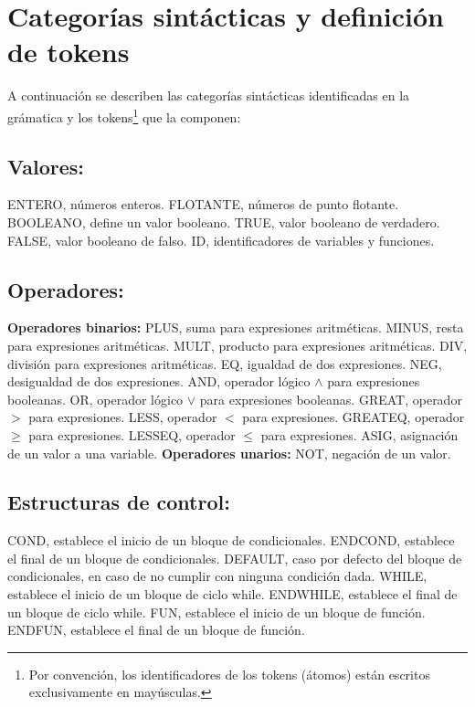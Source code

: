 \documentclass[12pt]{article}
\begin{document}
\section{Categorías sintácticas y definición de tokens}
A continuación se describen las categorías sintácticas identificadas en la grámatica y los tokens\footnote{Por convención, los identificadores de los tokens (átomos) están escritos exclusivamente en mayúsculas.} que la componen:\\
\subsection{Valores:}
\begin{outline}
  \2 ENTERO, números enteros.
    \2 FLOTANTE, números de punto flotante.
    \2 BOOLEANO, define un valor booleano.
    \3 TRUE, valor booleano de verdadero.
    \3 FALSE, valor booleano de falso.
    \3 ID, identificadores de variables y funciones.
\end{outline}
\subsection{Operadores:}
\begin{outline}
	\2 \textbf{Operadores binarios:}
		\3 PLUS, suma para expresiones aritméticas.	
    	\3 MINUS, resta para expresiones aritméticas.
    	\3 MULT, producto para expresiones aritméticas.
    	\3 DIV, división para expresiones aritméticas.
    	\3 EQ, igualdad de dos expresiones.
        \3 NEG, desigualdad de dos expresiones.
    	\3 AND, operador lógico $\land$ para expresiones booleanas.
    	\3 OR, operador lógico $\lor$ para expresiones booleanas.
    	\3 GREAT, operador $>$  para expresiones.
    	\3 LESS, operador $<$ para expresiones.
    	\3 GREATEQ, operador $\geq$ para expresiones.
        \3 LESSEQ, operador $\leq$ para expresiones.
        \3 ASIG, asignación de un valor a una variable.
 	\2 \textbf{Operadores unarios:}
    	\3 NOT, negación de un valor.
\end{outline}
\subsection{Estructuras de control:}
\begin{outline}
 	\2 COND, establece el inicio de un bloque de condicionales.
    \2 ENDCOND, establece el final de un bloque de condicionales.
    \2 DEFAULT, caso por defecto del bloque de condicionales, en caso de no cumplir con ninguna condición dada.
    \2 WHILE, establece el inicio de un bloque de ciclo while.
    \2 ENDWHILE, establece el final de un bloque de ciclo while.
    \2 FUN, establece el inicio de un bloque de función.
    \2 ENDFUN, establece el final de un bloque de función.
\end{outline}
\end{document}
